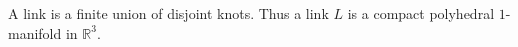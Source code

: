 A link is a finite union of disjoint knots. Thus a link $L$ is a compact polyhedral $1$-manifold in $\mathbb{R}^3$.
